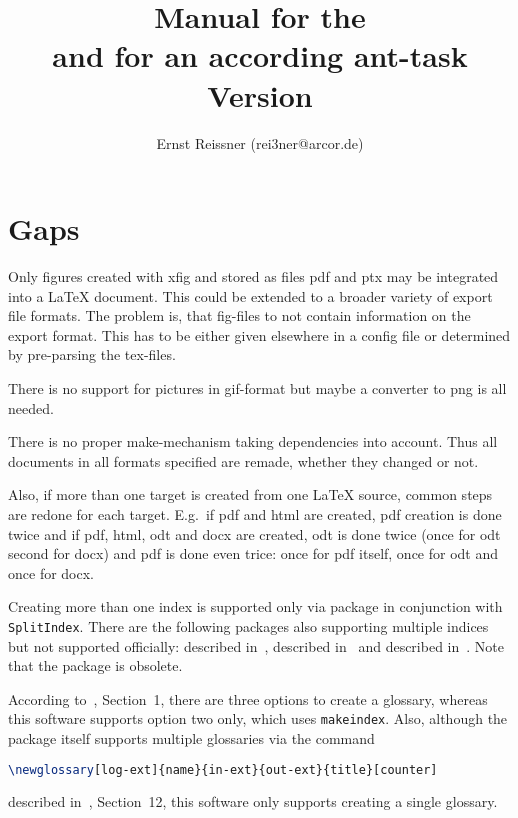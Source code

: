 \documentclass[a4paper,12pt]{book}
\title{Manual for the \artifactId{} \protect\\
  and for an according ant-task \protect\\
Version \strippedVersionID}
\author{Ernst Reissner (rei3ner@arcor.de)}
\date{\versionDate}
\newcommand{\gls}[1]{#1}
\renewcommand{\lstlistoflistings}{\begingroup
\tocfile{\lstlistingname}{lol}
\endgroup}
\renewcommand{\lstlistoflistings}{\begingroup
\tocfile{List of \lstlistingname{}s}{lol}
\endgroup}
\begin{document}
\maketitle

\tableofcontents
\listoffigures
\listoftables
\lstlistoflistings%











\chapter{Gaps}\label{chap:gaps}

Only figures created with xfig and stored as files pdf and ptx 
may be integrated into a \LaTeX{} document. 
This could be extended to a broader variety of export file formats. 
The problem is, that fig-files to not contain information on the export
format. 
This has to be either given elsewhere in a config file 
or determined by pre-parsing the tex-files. 

There is no support for pictures in \gls{gif}-format 
but maybe a converter to \gls{png} is all needed. 

There is no proper make-mechanism taking dependencies into account. 
Thus all documents in all formats specified are remade, 
whether they changed or not. 

Also, if more than one target is created from one \LaTeX{} source, 
common steps are redone for each target. 
E.g.~if pdf and html are created, 
pdf creation is done twice and if pdf, html, odt and docx are created, 
odt is done twice (once for odt second for docx) 
and pdf is done even trice: 
once for pdf itself, once for odt and once for docx. 

Creating more than one index is supported only 
via package  in conjunction with \texttt{SplitIndex}. 
There are the following packages also supporting multiple indices 
but not supported officially: 
 described in~\cite{IndexP}, 
 described in~\cite{AmsmidxP} and 
 described in~\cite{ImakeidxP}.
Note that the package  is obsolete. 

According to~\cite{GloP}, Section~1, 
there are three options to create a glossary, 
whereas this software supports option two only, 
which uses \texttt{makeindex}. 
Also, although the package  itself 
supports multiple glossaries via the command
%
\begin{lstlisting}[language=TeX, basicstyle=\small]
\newglossary[log-ext]{name}{in-ext}{out-ext}{title}[counter]
\end{lstlisting}
%
described in~\cite{GloP}, Section~12, 
this software only supports creating a single glossary. 
\end{document}
